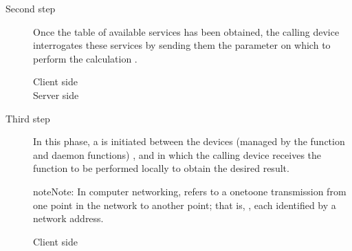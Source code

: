 \documentclass[a4paper,10pt,english,openany,oneside]{sphinxmanual}
\begin{document}
\begin{description}
\item[{Second step}] \leavevmode
Once the table of available services has been obtained, the
calling device interrogates these services  by
sending them the parameter on which to perform the calculation
.
\begin{description}
\item[{Client side}] \leavevmode
\begin{sphinxVerbatim}[commandchars=\\\{\}]
  
\end{sphinxVerbatim}

\item[{Server side}] \leavevmode
\begin{sphinxVerbatim}[commandchars=\\\{\}]
 \PYG{p}{[}\PYG{p}{]} 
    \PYG{p}{[}\PYG{p}{]}  
\end{sphinxVerbatim}

\end{description}

\item[{Third step}] \leavevmode
In this phase, a  is initiated between the
devices (managed by the function and daemon functions) , and in which the
calling device receives the function to be performed locally to
obtain the desired result.

\begin{sphinxadmonition}{note}{Note:}
In computer networking,  refers to a one\sphinxhyphen{}to\sphinxhyphen{}one
transmission from one point in the network to another point;
that is, , each identified by a
network address.
\end{sphinxadmonition}
\begin{description}
\item[{Client side}] \leavevmode
\begin{sphinxVerbatim}[commandchars=\\\{\}]
 
     
\end{sphinxVerbatim}


\end{description}
\end{description}
\end{document}
